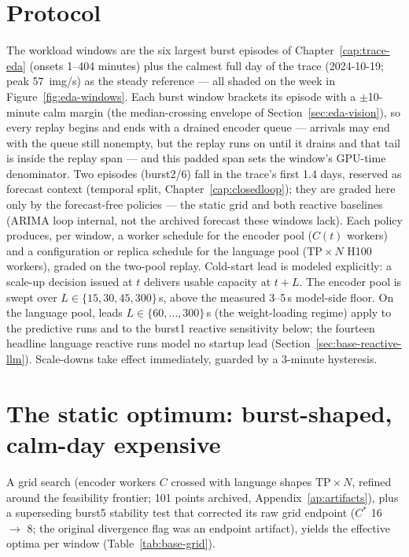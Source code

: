 \section{Protocol}
\label{sec:base-protocol}

The workload windows are the six largest burst episodes of
Chapter~\ref{cap:trace-eda} (onsets 1--404 minutes) plus the calmest full
day of the trace (2024-10-19; peak \SI{57}{img/s}) as the steady
reference --- all shaded on the week in Figure~\ref{fig:eda-windows}. Each burst window
brackets its episode with a $\pm$10-minute calm margin (the median-crossing
envelope of Section~\ref{sec:eda-vision}), so every replay begins and ends
with a drained encoder queue --- arrivals may end with the queue still
nonempty, but the replay runs on until it drains and that tail is inside
the replay span --- and this padded span sets the
window's GPU-time denominator. Two episodes
(burst2/6) fall in the trace's first 1.4 days, reserved as forecast
context (temporal split, Chapter~\ref{cap:closedloop}); they are graded
here only by the forecast-free policies --- the static grid and both
reactive baselines (ARIMA loop internal, not the archived forecast these
windows lack). Each policy produces, per window, a worker schedule for
the encoder pool ($C(t)$ workers) and a configuration or replica schedule
for the language pool ($\mathrm{TP}\times N$ H100 workers), graded on the
two-pool replay. Cold-start lead is modeled explicitly: a scale-up
decision issued at $t$ delivers usable capacity at $t+L$. The encoder
pool is swept over $L \in \{15,30,45,300\}$\,\si{\second}, above the
measured 3--5\,\si{\second} model-side floor. On the language pool,
leads $L \in \{60,\ldots,300\}$\,\si{\second} (the weight-loading
regime) apply to the predictive runs and to the burst1 reactive
sensitivity below; the fourteen headline language reactive runs model
no startup lead (Section~\ref{sec:base-reactive-llm}).
Scale-downs take effect immediately, guarded by a 3-minute hysteresis.

\section{The static optimum: burst-shaped, calm-day expensive}
\label{sec:base-static}

A grid search (encoder workers $C$ crossed with language shapes
$\mathrm{TP}\times N$, refined around the feasibility frontier; 101 points
archived, Appendix~\ref{ap:artifacts}), plus a superseding burst5
stability test that corrected its raw grid endpoint ($C^{*}$ 16 $\to$ 8;
the original divergence flag was an endpoint artifact), yields the
effective optima per window (Table~\ref{tab:base-grid}).

